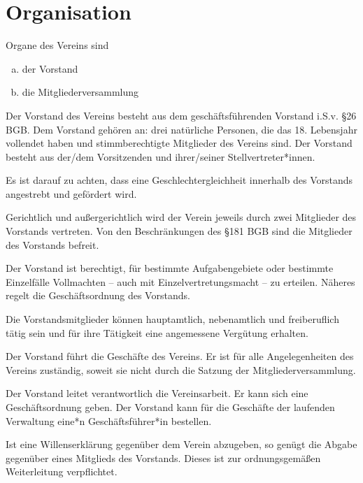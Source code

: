 \section{Organisation}
\begin{contract}

    Organe des Vereins sind
    \begin{enumerate}[(a)]
        \item der Vorstand
        \item die Mitgliederversammlung
    \end{enumerate}

    Der Vorstand des Vereins besteht aus dem geschäftsführenden Vorstand i.S.v. \S 26 BGB. Dem Vorstand gehören an: drei natürliche Personen, die das 18. Lebensjahr vollendet haben und stimmberechtigte Mitglieder des Vereins sind. Der Vorstand besteht aus der/dem Vorsitzenden und ihrer/seiner Stellvertreter*innen.

    Es ist darauf zu achten, dass eine Geschlechtergleichheit innerhalb des Vorstands angestrebt und gefördert wird.

    Gerichtlich und außergerichtlich wird der Verein jeweils durch zwei Mitglieder des Vorstands vertreten. Von den Beschränkungen des \S 181 BGB sind die Mitglieder des Vorstands befreit.

    Der Vorstand ist berechtigt, für bestimmte Aufgabengebiete oder bestimmte Einzelfälle Vollmachten – auch mit Einzelvertretungsmacht – zu erteilen. Näheres regelt die Geschäftsordnung des Vorstands.

    Die Vorstandsmitglieder können hauptamtlich, nebenamtlich und freiberuflich tätig sein und für ihre Tätigkeit eine angemessene Vergütung erhalten.

    Der Vorstand führt die Geschäfte des Vereins. Er ist für alle Angelegenheiten des Vereins zuständig, soweit sie nicht durch die Satzung der Mitgliederversammlung.

    Der Vorstand leitet verantwortlich die Vereinsarbeit. Er kann sich eine Geschäftsordnung geben. Der Vorstand kann für die Geschäfte der laufenden Verwaltung eine*n Geschäftsführer*in bestellen.

    Ist eine Willenserklärung gegenüber dem Verein abzugeben, so genügt die Abgabe gegenüber eines Mitglieds des Vorstands. Dieses ist zur ordnungsgemäßen Weiterleitung verpflichtet.


\end{contract}
